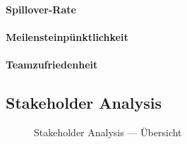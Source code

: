 \documentclass{article}
\begin{document}
\paragraph{Spillover-Rate}
\paragraph{Meilensteinpünktlichkeit}
\paragraph{Teamzufriedenheit}





\subsection{Stakeholder Analysis}

\begin{figure}[H]
  \centering
  
  \caption{Stakeholder Analysis — Übersicht}
  \label{fig:swot-produkt}
\end{figure}
\end{document}
